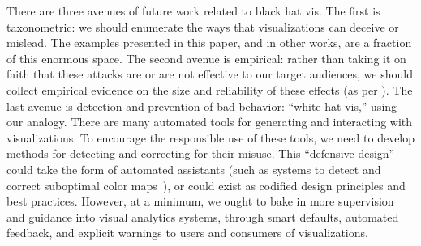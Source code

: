 \documentclass{vgtc}                          %
\begin{document}
There are three avenues of future work related to black hat vis. The first is taxonometric: we should enumerate the ways that visualizations can deceive or mislead. The examples presented in this paper, and in other works, are a fraction of this enormous space. The second avenue is empirical: rather than taking it on faith that these attacks are or are not effective to our target audiences, we should collect empirical evidence on the size and reliability of these effects (as per \cite{boy2017showing,pandey2014persuasive}). The last avenue is detection and prevention of bad behavior: ``white hat vis,'' using our analogy. There are many automated tools for generating and interacting with visualizations. To encourage the responsible use of these tools, we need to develop methods for detecting and correcting for their misuse. This ``defensive design'' could take the form of automated assistants (such as systems to detect and correct suboptimal color maps~\cite{poco2018extracting}), or could exist as codified design principles and best practices. However, at a minimum, we ought to bake in more supervision and guidance into visual analytics systems, through smart defaults, automated feedback, and explicit warnings to users and consumers of visualizations.

%

%
%
%


\end{document}
